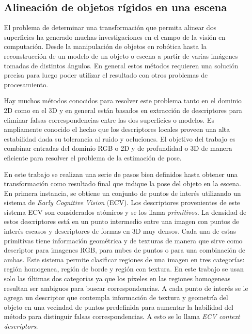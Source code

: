 \subsection{Alineación de objetos rígidos en una escena}\label{alignment_prerejective}
El problema de determinar una transformación que permita alinear dos superficies ha generado muchas investigaciones en el campo de la visión en computación. Desde la manipulación de objetos en robótica hasta la reconstrucción de un modelo de un objeto o escena a partir de varias imágenes tomadas de distintos ángulos. En general estos métodos requieren una solución precisa para luego poder utilizar el resultado con otros problemas de procesamiento.

Hay muchos métodos conocidos para resolver este problema tanto en el dominio 2D como en el 3D y en general están basados en extracción de descriptores para eliminar falsas correspondencias entre las dos superficies o modelos. Es ampliamente conocido el hecho que los descriptores locales proveen una alta estabilidad dada su tolerancia al ruido y ocluciones. El objetivo del trabajo \cite{6630856} es combinar entradas del dominio RGB o 2D y de profundidad o 3D de manera eficiente para resolver el problema de la estimación de pose.

En este trabajo se realizan una serie de pasos bien definidos hasta obtener una transformación como resultado final que indique la pose del objeto en la escena. En primera instancia, se obtiene un conjunto de puntos de interés utilizando un sistema de \textit{Early Cognitive Vision} (ECV). Los descriptores provenientes de este sistema ECV son considerados atómicos y se los llama \textit{primitivos}. La densidad de estos descriptores está en un punto intermedio entre una imagen con puntos de interés escasos y descriptores de formas en 3D muy densos. Cada una de estas primitivas tiene información geométrica y de texturas de manera que sirve como descriptor para imagenes RGB, para nubes de puntos o para una combinación de ambas. Este sistema permite clasificar regiones de una imagen en tres categorías: región homogenea, región de borde y región con textura. En este trabajo se usan solo las últimas dos categorías ya que los píxeles en las regiones homogeneas resultan ser ambiguos para buscar correspondencias.
A cada punto de interés se le agrega un descriptor que contempla información de textura y geometría del objeto en una vecindad de puntos predefinida para aumentar la habilidad del método para distinguir falsas correspondencias. A esto se lo llama \textit{ECV context descriptors}.

